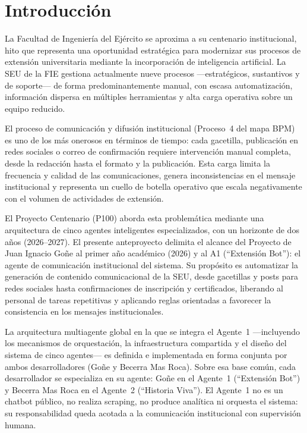 \documentclass[a4paper, 12pt]{article}
\begin{document}
\section{Introducci\'on}

La Facultad de Ingenier\'ia del Ej\'ercito se aproxima a su centenario institucional, hito que representa una oportunidad estrat\'egica para modernizar sus procesos de extensi\'on universitaria mediante la incorporaci\'on de inteligencia artificial. La \ac{SEU} de la \ac{FIE} gestiona actualmente nueve procesos ---estrat\'egicos, sustantivos y de soporte--- de forma predominantemente manual, con escasa automatizaci\'on, informaci\'on dispersa en m\'ultiples herramientas y alta carga operativa sobre un equipo reducido.

El proceso de comunicaci\'on y difusi\'on institucional (Proceso~4 del mapa \ac{BPM}) es uno de los m\'as onerosos en t\'erminos de tiempo: cada gacetilla, publicaci\'on en redes sociales o correo de confirmaci\'on requiere intervenci\'on manual completa, desde la redacci\'on hasta el formato y la publicaci\'on. Esta carga limita la frecuencia y calidad de las comunicaciones, genera inconsistencias en el mensaje institucional y representa un cuello de botella operativo que escala negativamente con el volumen de actividades de extensi\'on.

El Proyecto Centenario (\ac{P100}) aborda esta problem\'atica mediante una arquitectura de cinco agentes inteligentes especializados, con un horizonte de dos a\~nos (2026--2027). El presente anteproyecto delimita el alcance del Proyecto de Juan Ignacio Go\~ne al primer a\~no acad\'emico (2026) y al \ac{A1} (``Extensi\'on Bot''): el agente de comunicaci\'on institucional del sistema. Su prop\'osito es automatizar la generaci\'on de contenido comunicacional de la \ac{SEU}, desde gacetillas y posts para redes sociales hasta confirmaciones de inscripci\'on y certificados, liberando al personal de tareas repetitivas y aplicando reglas orientadas a favorecer la consistencia en los mensajes institucionales.

La arquitectura multiagente global en la que se integra el Agente~1 ---incluyendo los mecanismos de orquestaci\'on, la infraestructura compartida y el dise\~no del sistema de cinco agentes--- es definida e implementada en forma conjunta por ambos desarrolladores (Go\~ne y Becerra Mas Roca). Sobre esa base com\'un, cada desarrollador se especializa en su agente: Go\~ne en el Agente~1 (``Extensi\'on Bot'') y Becerra Mas Roca en el Agente~2 (``Historia Viva''). El Agente~1 no es un chatbot p\'ublico, no realiza scraping, no produce anal\'itica ni orquesta el sistema: su responsabilidad queda acotada a la comunicaci\'on institucional con supervisi\'on humana.
\end{document}
